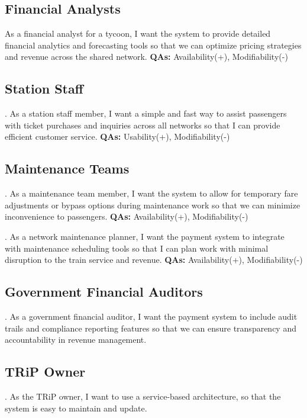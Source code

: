 \subsection{Financial Analysts}

\noindent
As a financial analyst for a tycoon, I want the system to provide detailed financial analytics and forecasting tools so that we can optimize pricing strategies and revenue across the shared network. \textbf{QAs:} Availability(+), Modifiability(-)

\subsection{Station Staff}

. As a station staff member, I want a simple and fast way to assist passengers with ticket purchases and inquiries across all networks so that I can provide efficient customer service. \textbf{QAs:} Usability(+), Modifiability(-)

\subsection{Maintenance Teams}

. As a maintenance team member, I want the system to allow for temporary fare adjustments or bypass options during maintenance work so that we can minimize inconvenience to passengers. \textbf{QAs:} Availability(+), Modifiability(-)

. As a network maintenance planner, I want the payment system to integrate with maintenance scheduling tools so that I can plan work with minimal disruption to the train service and revenue. \textbf{QAs:} Availability(+), Modifiability(-)

\subsection{Government Financial Auditors}

. As a government financial auditor, I want the payment system to include audit trails and compliance reporting features so that we can ensure transparency and accountability in revenue management.

\subsection{TRiP Owner}
. As the TRiP owner, I want to use a service-based architecture, so that the system is easy to maintain and update.

